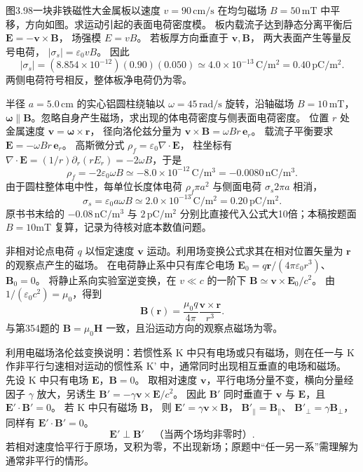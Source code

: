图3.98一块非铁磁性大金属板以速度
$v=90\,\mathrm{cm/s}$ 在均匀磁场
$B=50\,\mathrm{mT}$ 中平移，方向如图。求运动引起的表面电荷密度模。
\exsolution
板内载流子达到静态分离平衡后
$\bm E=-\bm v\times\bm B$，
场强模 $E=vB$。
若板厚方向垂直于 $\bm v,\bm B$，
两大表面产生等量反号电荷，
$|\sigma_s|=\varepsilon_0vB$。
因此
\[
\boxed{|\sigma_s|=
(8.854\times10^{-12})(0.90)(0.050)
\simeq4.0\times10^{-13}\,\mathrm{C/m^2}
=0.40\,\mathrm{pC/m^2}}.
\]
\excheck 两侧电荷符号相反，整体板净电荷仍为零。

半径 $a=5.0\,\mathrm{cm}$ 的实心铝圆柱绕轴以 $\omega=45\,\mathrm{rad/s}$ 旋转，沿轴磁场
$B=10\,\mathrm{mT}$，$\bm\omega\parallel\bm B$。忽略自身产生磁场，求出现的体电荷密度与侧表面电荷密度。
\exsolution
位置 $r$ 处金属速度
$\bm v=\bm\omega\times\bm r$，
径向洛伦兹分量为
$\bm v\times\bm B=\omega Br\,\bm e_r$。
载流子平衡要求
$\bm E=-\omega Br\,\bm e_r$。
高斯微分式
$\rho_f=\varepsilon_0\nabla\cdot\bm E$，
柱坐标有
$\nabla\cdot\bm E=(1/r)\partial_r(rE_r)
=-2\omega B$，于是
\[
\boxed{\rho_f=-2\varepsilon_0\omega B
\simeq-8.0\times10^{-12}\,\mathrm{C/m^3}
=-0.0080\,\mathrm{nC/m^3}}.
\]
由于圆柱整体电中性，每单位长度体电荷
$\rho_f\pi a^2$ 与侧面电荷
$\sigma_s2\pi a$ 相消，
\[
\boxed{\sigma_s=\varepsilon_0a\omega B
\simeq2.0\times10^{-13}\,\mathrm{C/m^2}
=0.20\,\mathrm{pC/m^2}}.
\]
\excheck 原书书末给的 $-0.08\,\mathrm{nC/m^3}$ 与 $2\,\mathrm{pC/m^2}$ 分别比直接代入公式大10倍；本稿按题面 $B=10$mT 复算，记录为待核对底本数值问题。

非相对论点电荷 $q$ 以恒定速度 $\bm v$ 运动。利用场变换公式求其在相对位置矢量为 $\bm r$ 的观察点产生的磁场。
\exsolution
在电荷静止系中只有库仑电场
$\bm E_0=q\bm r/(4\pi\varepsilon_0r^3)$、$\bm B_0=0$。
将静止系向实验室逆变换，在 $v\ll c$ 的一阶下
$\bm B\simeq\bm v\times\bm E_0/c^2$。
由 $1/(\varepsilon_0c^2)=\mu_0$，得到
\[
\boxed{\bm B(\bm r)=
\frac{\mu_0q}{4\pi}\frac{\bm v\times\bm r}{r^3}}.
\]
\excheck 与第354题的 $\bm B=\mu_0\bm H$ 一致，且沿运动方向的观察点磁场为零。

利用电磁场洛伦兹变换说明：若惯性系 K 中只有电场或只有磁场，则在任一与 K 作非平行匀速相对运动的惯性系 K' 中，通常同时出现相互垂直的电场和磁场。
\exsolution
先设 K 中只有电场 $\bm E$，$\bm B=0$。
取相对速度 $\bm v$，平行电场分量不变，横向分量经因子 $\gamma$ 放大，另诱生
$\bm B'=-\gamma\bm v\times\bm E/c^2$。
因此 $\bm B'$ 同时垂直于 $\bm v$ 与 $\bm E$，且
$\bm E'\cdot\bm B'=0$。
若 K 中只有磁场 $\bm B$，
则
$\bm E'=\gamma\bm v\times\bm B$，
$\bm B'_{\parallel}=\bm B_{\parallel}$、
$\bm B'_\perp=\gamma\bm B_\perp$，
同样有
$\bm E'\cdot\bm B'=0$。
\[
\boxed{\bm E'\perp\bm B'\quad
\text{（当两个场均非零时）}}.
\]
\excheck 若相对速度恰平行于原场，叉积为零，不出现新场；原题中“任一另一系”需理解为通常非平行的情形。

